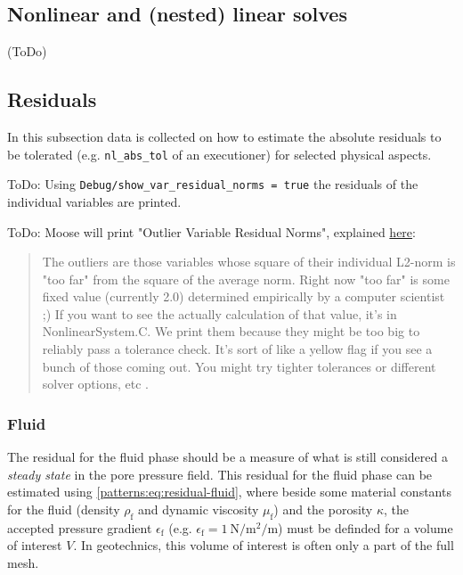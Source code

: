 \subsection{\todomarker Nonlinear and (nested) linear solves}

(ToDo)

\subsection{Residuals}

In this subsection data is collected on how to estimate the absolute residuals
to be tolerated (e.g. \texttt{nl\_abs\_tol} of an executioner) for selected
physical aspects.

ToDo: Using \texttt{Debug/show\_var\_residual\_norms = true} the residuals of
the individual variables are printed.

ToDo: Moose will print "Outlier Variable Residual Norms", explained
\href{https://groups.google.com/g/moose-users/c/76wkbH-cuFo/m/OT1Z6vbrm_0J}{here}:
\begin{quote}
  The outliers are those variables whose square of their individual L2-norm is
  "too far" from the square of the average norm. Right now "too far" is some
  fixed value (currently 2.0) determined empirically by a computer scientist ;)
  If you want to see the actually calculation of that value, it's in
  NonlinearSystem.C. We print them because they might be too big to reliably pass
  a tolerance check. It's sort of like a yellow flag if you see a bunch of those
  coming out. You might try tighter tolerances or different solver options, etc .
\end{quote}


\subsubsection{Fluid}

The residual for the fluid phase should be a measure of what is still
considered a \emph{steady state} in the pore pressure field. This residual for
the fluid phase can be estimated using \autoref{patterns:eq:residual-fluid},
where beside some material constants for the fluid (density $\rho_\mathrm{f}$
and dynamic viscosity $\mu_\mathrm{f}$) and the porosity $\kappa$, the accepted
pressure gradient $\epsilon_\mathrm{f}$ (e.g. $\epsilon_\mathrm{f} =
  \qty[per-mode = symbol]{1}{\newton\per\square\metre\per\metre} $) must be
definded for a volume of interest $V$. In geotechnics, this volume of interest
is often only a part of the full mesh.

